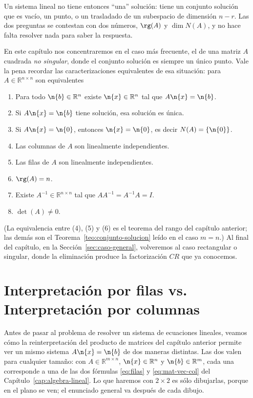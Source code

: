 Un sistema lineal no tiene entonces ``una'' solución: tiene un conjunto solución
que es vacío, un punto, o un trasladado de un subespacio de dimensión $n-r$. Las
dos preguntas se contestan con dos números, $\rg(A)$ y $\dim N(A)$, y no hace
falta resolver nada para saber la respuesta.

\medskip

En este capítulo nos concentraremos en el caso más frecuente, el de una matriz
$A$ cuadrada \emph{no singular}, donde el conjunto solución es siempre un único
punto. Vale la pena recordar las caracterizaciones equivalentes de esa
situación: para $A \in \mathbb{R}^{n\times n}$ son equivalentes

\begin{enumerate}[itemsep=1pt]
\item Para todo $\n{b} \in \mathbb{R}^n$ existe $\n{x} \in \mathbb{R}^n$ tal que $A\n{x} = \n{b}$.
\item Si $A\n{x} = \n{b}$ tiene solución, esa solución es única.
\item Si $A\n{x} = \n{0}$, entonces $\n{x} = \n{0}$, es decir $N(A)=\{\n{0}\}$.
\item Las columnas de $A$ son linealmente independientes.
\item Las filas de $A$ son linealmente independientes.
\item $\rg(A) = n$.
\item Existe $A^{-1} \in \mathbb{R}^{n\times n}$ tal que $A A^{-1} = A^{-1} A = I$.
\item $\det(A) \neq 0$.
\end{enumerate}

\noindent
(La equivalencia entre (4), (5) y (6) es el teorema del rango del capítulo
anterior; las demás son el Teorema~\ref{teo:conjunto-solucion} leído en el caso
$m=n$.) Al final del capítulo, en la Sección~\ref{sec:caso-general}, volveremos
al caso rectangular o singular, donde la eliminación produce la factorización
$CR$ que ya conocemos.

\section{Interpretación por filas vs. Interpretación por columnas}
Antes de pasar al problema de resolver un sistema de ecuaciones lineales,
veamos cómo la reinterpretación del producto de matrices del capítulo anterior
permite ver un mismo sistema $A\n{x}=\n{b}$ de dos maneras distintas. Las dos
valen para cualquier tamaño: con $A\in\mathbb{R}^{m\times n}$,
$\n{x}\in\mathbb{R}^n$ y $\n{b}\in\mathbb{R}^m$, cada una corresponde a una de
las dos fórmulas \eqref{eq:filas} y \eqref{eq:mat-vec-col} del
Capítulo~\ref{cap:algebra-lineal}. Lo que haremos con $2\times2$ es sólo
dibujarlas, porque en el plano se ven; el enunciado general va después de cada
dibujo.

